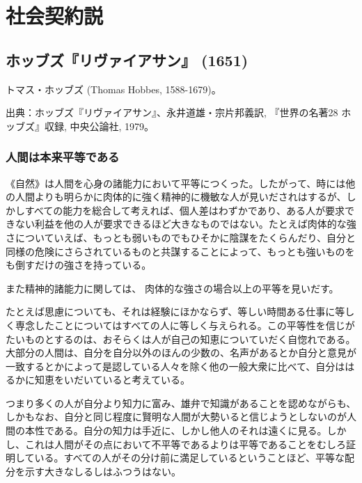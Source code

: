
\chapter{社会契約説}



\section{ホッブズ『リヴァイアサン』 (1651)}




トマス・ホッブズ (Thomas Hobbes, 1588-1679)。

出典：ホッブズ『リヴァイアサン』、永井道雄・宗片邦義訳, 『世界の名著28 ホッブズ』収録, 中央公論社, 1979。




\subsection{人間は本来平等である}



《自然》は人間を心身の諸能力において平等につくった。したがって、時には他の人間よりも明らかに肉体的に強く精神的に機敏な人が見いだされはするが、しかしすべての能力を総合して考えれば、個人差はわずかであり、ある人が要求できない利益を他の人が要求できるほど大きなものではない。たとえば肉体的な強さについていえば、もっとも弱いものでもひそかに陰謀をたくらんだり、自分と同様の危険にさらされているものと共謀することによって、もっとも強いものをも倒すだけの強さを持っている。



また精神的諸能力に関しては、
肉体的な強さの場合以上の平等を見いだす。



たとえば思慮についても、それは経験にほかならず、等しい時間ある仕事に等しく専念したことについてはすべての人に等しく与えられる。この平等性を信じがたいものとするのは、おそらくは人が自己の知恵についていだく自惚れである。大部分の人間は、自分を自分以外のほんの少数の、名声があるとか自分と意見が一致するとかによって是認している人々を除く他の一般大衆に比べて、自分ははるかに知恵をいだいていると考えている。

つまり多くの人が自分より知力に富み、雄弁で知識があることを認めながらも、しかもなお、自分と同じ程度に賢明な人間が大勢いると信じようとしないのが人間の本性である。自分の知力は手近に、しかし他人のそれは遠くに見る。しかし、これは人間がその点において不平等であるよりは平等であることをむしろ証明している。すべての人がその分け前に満足しているということほど、平等な配分を示す大きなしるしはふつうはない。


